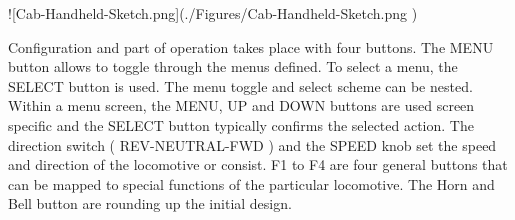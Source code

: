 ![Cab-Handheld-Sketch.png](./Figures/Cab-Handheld-Sketch.png )

Configuration and part of operation takes place with four buttons. The MENU button allows to toggle through the menus defined. To select a menu, the SELECT button is used. The menu toggle and select scheme can be nested. Within a menu screen, the MENU, UP and DOWN buttons are used screen specific and the SELECT button typically confirms the selected action. The direction switch ( REV-NEUTRAL-FWD ) and the SPEED knob set the speed and direction of the locomotive or consist. F1 to F4 are four general buttons that can be mapped to special functions of the particular locomotive. The Horn and Bell button are rounding up the initial design.